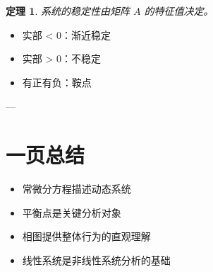\documentclass[11pt]{article}
\numberwithin{equation}{section}
\theoremstyle{plain}
\newtheorem{theorem}{定理}[section]
\theoremstyle{definition}
\theoremstyle{remark}
\begin{document}
\begin{theorem}
系统的稳定性由矩阵 $A$ 的特征值决定。
\end{theorem}

\begin{AnalysisBox}
\begin{itemize}
\item 实部 < 0：渐近稳定
\item 实部 > 0：不稳定
\item 有正有负：鞍点
\end{itemize}
\end{AnalysisBox}

---

\section{一页总结}

\begin{itemize}
  \item 常微分方程描述动态系统
  \item 平衡点是关键分析对象
  \item 相图提供整体行为的直观理解
  \item 线性系统是非线性系统分析的基础
\end{itemize}
\end{document}
